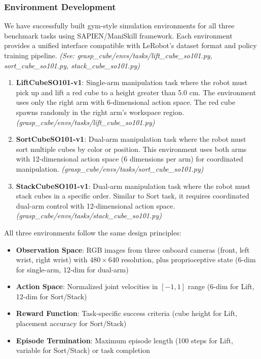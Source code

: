 \documentclass[10pt]{article} %
\begin{document}
\subsubsection{Environment Development}

We have successfully built gym-style simulation environments for all three benchmark tasks using SAPIEN/ManiSkill framework. Each environment provides a unified interface compatible with LeRobot's dataset format and policy training pipeline. \textit{(See: grasp\_cube/envs/tasks/lift\_cube\_so101.py, sort\_cube\_so101.py, stack\_cube\_so101.py)}

\begin{enumerate}
    \item \textbf{LiftCubeSO101-v1}: Single-arm manipulation task where the robot must pick up and lift a red cube to a height greater than 5.0 cm. The environment uses only the right arm with 6-dimensional action space. The red cube spawns randomly in the right arm's workspace region. \textit{(grasp\_cube/envs/tasks/lift\_cube\_so101.py)}

    \item \textbf{SortCubeSO101-v1}: Dual-arm manipulation task where the robot must sort multiple cubes by color or position. This environment uses both arms with 12-dimensional action space (6 dimensions per arm) for coordinated manipulation. \textit{(grasp\_cube/envs/tasks/sort\_cube\_so101.py)}

    \item \textbf{StackCubeSO101-v1}: Dual-arm manipulation task where the robot must stack cubes in a specific order. Similar to Sort task, it requires coordinated dual-arm control with 12-dimensional action space. \textit{(grasp\_cube/envs/tasks/stack\_cube\_so101.py)}
\end{enumerate}

All three environments follow the same design principles:
\begin{itemize}
    \item \textbf{Observation Space}: RGB images from three onboard cameras (front, left wrist, right wrist) with $480 \times 640$ resolution, plus proprioceptive state (6-dim for single-arm, 12-dim for dual-arm)
    \item \textbf{Action Space}: Normalized joint velocities in $[-1, 1]$ range (6-dim for Lift, 12-dim for Sort/Stack)
    \item \textbf{Reward Function}: Task-specific success criteria (cube height for Lift, placement accuracy for Sort/Stack)
    \item \textbf{Episode Termination}: Maximum episode length (100 steps for Lift, variable for Sort/Stack) or task completion
\end{itemize}
\end{document}
